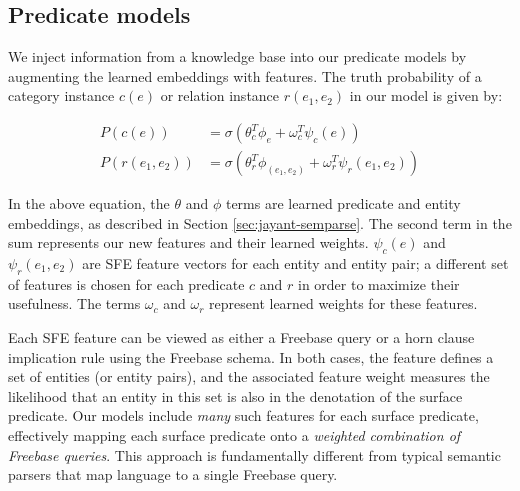 \documentclass[11pt]{article}
\newcommand{\lexicalpredicate}[1]{\ensuremath{\textit{#1}}}
\newcommand{\entity}[1]{\ensuremath{\textsc{#1}}}
\begin{document}

\subsection{Predicate models}
\label{sec:formal-and-distributional}


We inject information from a knowledge base into our predicate models
by augmenting the learned embeddings with features. The truth
probability of a category instance $c(e)$ or relation instance $r(e_1,
e_2)$ in our model is given by:

\begin{align*}
  P(c(e)) &= \sigma ( \theta_c^T \phi_e + \omega_c^T \psi_c(e)) \\
  P(r(e_1, e_2)) &= \sigma ( \theta_r^T \phi_{(e_1, e_2)} + \omega_r^T \psi_r(e_1, e_2) )
\end{align*}

In the above equation, the $\theta$ and $\phi$ terms are learned
predicate and entity embeddings, as described in Section
\ref{sec:jayant-semparse}. The second term in the sum represents our
new features and their learned weights. $\psi_c(e)$ and $\psi_r(e_1,
e_2)$ are SFE feature vectors for each entity and entity pair; a
different set of features is chosen for each predicate $c$ and $r$ in
order to maximize their usefulness. The terms $\omega_c$ and
$\omega_r$ represent learned weights for these features.

Each SFE feature can be viewed as either a Freebase query or a horn
clause implication rule using the Freebase schema. In both cases, the
feature defines a set of entities (or entity pairs), and the
associated feature weight measures the likelihood that an entity in
this set is also in the denotation of the surface predicate. Our
models include \emph{many} such features for each surface predicate,
effectively mapping each surface predicate onto a \emph{weighted
  combination of Freebase queries}. This approach is fundamentally
different from typical semantic parsers that map language to a single
Freebase query.
\end{document}
